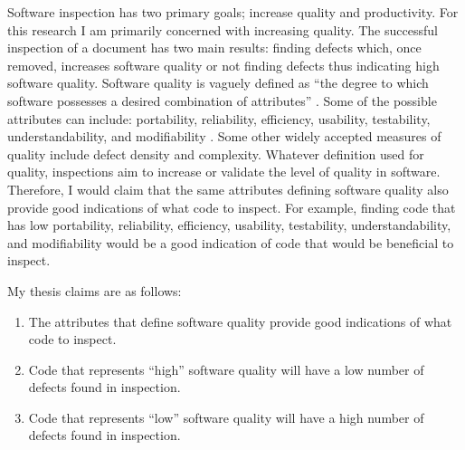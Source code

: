 Software inspection has two primary goals; increase quality and
productivity. For this research I am primarily concerned with increasing
quality. The successful inspection of a document has two main results:
finding defects which, once removed, increases software quality or not
finding defects thus indicating high software quality. Software quality is
vaguely defined as ``the degree to which software possesses a desired
combination of attributes'' \cite{IEEEGlossary83}. Some of the possible
attributes can include: portability, reliability, efficiency, usability,
testability, understandability, and modifiability \cite{Glass03}. Some
other widely accepted measures of quality include defect density and
complexity.  Whatever definition used for quality, inspections aim to
increase or validate the level of quality in software. Therefore, I would
claim that the same attributes defining software quality also provide good
indications of what code to inspect. For example, finding code that has low
portability, reliability, efficiency, usability, testability,
understandability, and modifiability would be a good indication of code
that would be beneficial to inspect.

My thesis claims are as follows: 
\begin{enumerate}
\item The attributes that define software quality provide good indications
  of what code to inspect.
\item Code that represents ``high'' software quality will have a low number
  of defects found in inspection.
\item Code that represents ``low'' software quality will have a high number
  of defects found in inspection.
\end{enumerate}


